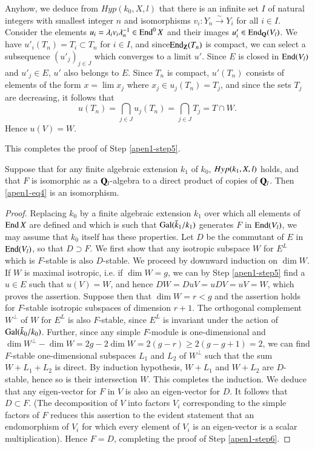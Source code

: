 Anyhow, we deduce from $Hyp(k_0 , X, l)$ that there is an infinite set $I$ of  natural integers with smallest integer $n$ and isomorphisms $v_i: Y_n \xrightarrow{\sim} Y_i$ for all $i \in I$. Consider the elements $u_i = \lambda_i v_i \lambda^{-1}_n \in \operatorname{End}^0 X$ and their images $u'_i \in \operatorname{End}_{\mathbf{Q}}(V_l)$. We have $u'_i(T_n) = T_i\subset T_n$ for $i \in I$, and since\pageoriginale $\operatorname{End}_{\mathbf{Z}}(T_n)$ is compact, we can select a subsequence $(u'_j)_{j \in J}$ which converges to a limit $u'$. Since $E$ is closed in $\operatorname{End} (V_l)$ and $u'_j \in E$, $u'$ also belongs to $E$. Since $T_n$ is compact, $u'(T_n)$ consists of elements of the form $x =\lim x_j$ where $x_j \in u_j(T_n) = T_j$, and since the sets $T_j$ are decreasing, it follows that
$$
u(T_n) = \bigcap_{j\in J} u_j (T_n) = \bigcap_{j \in J} T_j = T \cap W.
$$
Hence $u (V) = W$.

This completes the proof of Step \ref{apen1-step5}.

\begin{romanstep}\label{apen1-step6}
Suppose that for any finite algebraic extension $k_1$ of $k_0$, $Hyp(k_1,\\ X, l)$ holds, and that $F$ is isomorphic as a $\mathbf{Q}_l$-algebra to a direct product of copies of $\mathbf{Q}_l$. Then \eqref{apen1-eq4} is an isomorphism.
\end{romanstep}

\begin{proof}
Replacing $k_0$ by a finite algebraic extension $k_1$ over which all elements of $\operatorname{End} X$ are defined and which is such that $\operatorname{Gal} (\bar{k}_1/k_1)$ generates $F$ in $\operatorname{End} (V_l)$, we may assume that $k_0$ itself has these properties. Let $D$ be the commutant of $E$ in $\operatorname{End} (V_l)$, so that $D \supset F$. We first show that any isotropic subspace $W$ for $E^L$ which is $F$-stable is also $D$-stable. We proceed by downward induction on $\dim W$. If $W$ is maximal isotropic, i.e. if $\dim W = g$, we can by Step \ref{apen1-step5} find a $u \in E$ such that $u (V) = W$, and hence $D W = D u V = u D V = u V = W$, which proves the assertion. Suppose then that $\dim W = r < g$ and the assertion holds for $F$-stable isotropic subspaces of dimension $r +1$. The orthogonal complement $W^{\bot}$ of $W$ for $E^L$ is also $F$-stable, since $E^L$ is invariant under the action of $\operatorname{Gal}(\bar{k}_0/k_0)$. Further, since any simple $F$-module is one-dimensional and $\dim W^\bot - \dim W = 2g - 2 \dim W= 2 (g -r) \geqslant 2 (g -g +1) =2$, we can find $F$-stable one-dimensional subspaces $L_1$ and $L_2$ of $W^\bot$ such that the sum $W + L_1 + L_2$ is direct. By induction hypothesis, $W + L_1$ and $W+ L_2$ are $D$-stable, hence so is their intersection $W$. This completes the induction. We deduce that any eigen-vector for $F$ in $V$ is also an eigen-vector for $D$. It follows that $D \subset F$. (The decomposition of $V$ into factors $V_i$ corresponding to the simple factors of $F$ reduces this assertion to the evident statement that an endomorphism of $V_i$ for which every element of $V_i$ is an eigen-vector is a scalar multiplication). Hence $F = D$, completing the proof of Step \ref{apen1-step6}.
\end{proof}

